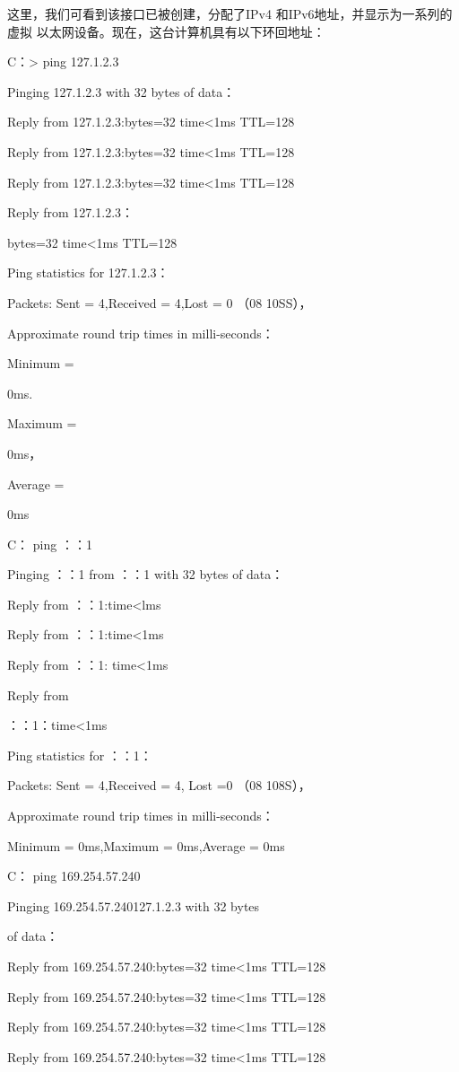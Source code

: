 这里，我们可看到该接口已被创建，分配了IPv4 和IPv6地址，并显示为一系列的虚拟
以太网设备。现在，这台计算机具有以下环回地址：

C：> ping 127.1.2.3

Pinging 127.1.2.3 with 32 bytes of data：

Reply from 127.1.2.3:bytes=32 time<1ms TTL=128

Reply from 127.1.2.3:bytes=32 time<1ms TTL=128

Reply from 127.1.2.3:bytes=32 time<1ms TTL=128

Reply from 127.1.2.3：

bytes=32 time<1ms TTL=128

Ping statistics for 127.1.2.3：

Packets: Sent = 4,Received = 4,Lost = 0 （08 10SS），

Approximate round trip times in milli-seconds：

Minimum =

0ms.

Maximum =

0ms，

Average =

0ms

C：\> ping ：：1

Pinging ：：1 from ：：1 with 32 bytes of data：

Reply from ：：1:time<lms

Reply from ：：1:time<1ms

Reply from ：：1: time<1ms

Reply from

：：1：time<1ms

Ping statistics for ：：1：

Packets: Sent = 4,Received = 4, Lost =0 （08 108S），

Approximate round trip times in milli-seconds：

Minimum = 0ms,Maximum = 0ms,Average = 0ms

C：\> ping 169.254.57.240

Pinging 169.254.57.240127.1.2.3 with 32 bytes

of data：

Reply from 169.254.57.240:bytes=32 time<1ms TTL=128

Reply from 169.254.57.240:bytes=32 time<1ms TTL=128

Reply from 169.254.57.240:bytes=32 time<1ms TTL=128

Reply from 169.254.57.240:bytes=32 time<1ms TTL=128

